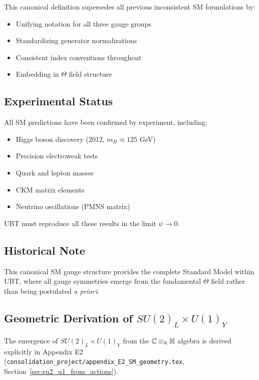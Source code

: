 This canonical definition supersedes all previous inconsistent SM formulations by:

\begin{itemize}
    \item Unifying notation for all three gauge groups
    \item Standardizing generator normalizations
    \item Consistent index conventions throughout
    \item Embedding in $\Theta$ field structure
\end{itemize}

\subsection{Experimental Status}

All SM predictions have been confirmed by experiment, including:
\begin{itemize}
    \item Higgs boson discovery (2012, $m_H \approx 125$ GeV)
    \item Precision electroweak tests
    \item Quark and lepton masses
    \item CKM matrix elements
    \item Neutrino oscillations (PMNS matrix)
\end{itemize}

UBT must reproduce all these results in the limit $\psi \to 0$.

\subsection{Historical Note}

This canonical SM gauge structure provides the complete Standard Model within UBT, where all gauge symmetries emerge from the fundamental $\Theta$ field rather than being postulated \textit{a priori}.

\subsection{Geometric Derivation of $SU(2)_L \times U(1)_Y$}

The emergence of $SU(2)_L \times U(1)_Y$ from the $\mathbb C\otimes_\mathbb R\mathbb H$ algebra is derived
explicitly in Appendix E2 (\texttt{consolidation\_project/appendix\_E2\_SM\_geometry.tex},
Section~\ref{sec:su2_u1_from_actions}).

